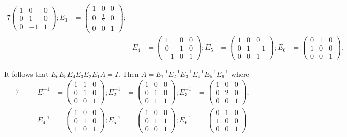 \begin{Exercise}
\begin{solution}
\begin{alignat*}{7}
\begin{pmatrix}
1 & 0 & 0 \\
0 & 1 & 0 \\
0 & -1 & 1
\end{pmatrix}; E_3 &= \begin{pmatrix}
1 & 0 & 0 \\
0 & \frac{1}{2} & 0 \\
0 & 0 & 1
\end{pmatrix}; \\
\quad&& E_4 &= \begin{pmatrix}
1 & 0 & 0 \\
0 & 1 & 0 \\
-1 & 0 & 1
\end{pmatrix}; E_5 &= \begin{pmatrix}
1 & 0 & 0 \\
0 & 1 & -1 \\
0 & 0 & 1
\end{pmatrix}; E_6 &= \begin{pmatrix}
0 & 1 & 0 \\
1 & 0 & 0 \\
0 & 0 & 1
\end{pmatrix}.
\end{alignat*}

It follows that $E_6 E_5 E_4 E_3 E_2 E_1 A = I$. Then $A = E_1^{-1} E_2^{-1} E_3^{-1} E_4^{-1} E_5^{-1} E_6^{-1}$ where \begin{alignat*}{7}
\quad&& E_1^{-1} &= \begin{pmatrix}
1 & 1 & 0 \\
0 & 1 & 0 \\
0 & 0 & 1
\end{pmatrix}; E_2^{-1} &= \begin{pmatrix}
1 & 0 & 0 \\
0 & 1 & 0 \\
0 & 1 & 1
\end{pmatrix}; E_3^{-1} &= \begin{pmatrix}
1 & 0 & 0 \\
0 & 2 & 0 \\
0 & 0 & 1
\end{pmatrix}; \\
\quad&& E_4^{-1} &= \begin{pmatrix}
1 & 0 & 0 \\
0 & 1 & 0 \\
1 & 0 & 1
\end{pmatrix}; E_5^{-1} &= \begin{pmatrix}
1 & 0 & 0 \\
0 & 1 & 1 \\
0 & 0 & 1
\end{pmatrix}; E_6^{-1} &= \begin{pmatrix}
0 & 1 & 0 \\
1 & 0 & 0 \\
0 & 0 & 1
\end{pmatrix}.
\end{alignat*}
\end{solution}
\end{Exercise}
